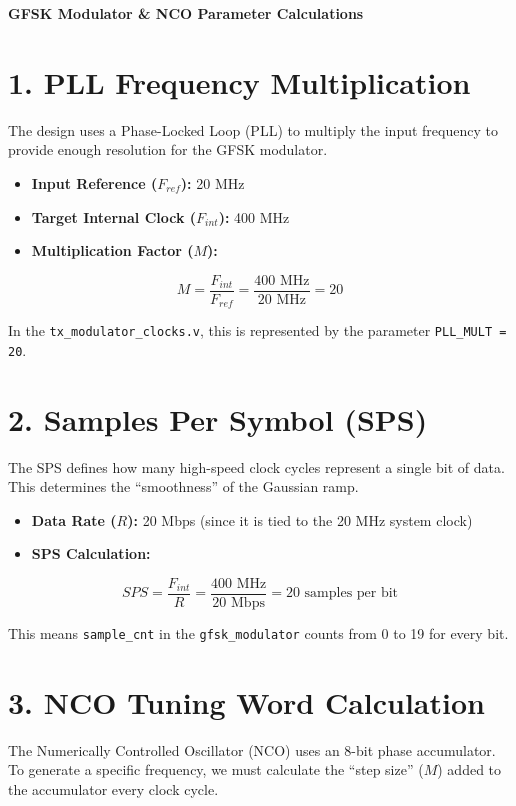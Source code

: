 \documentclass[12pt]{article}
\begin{document}
\begin{center}
    \Large\textbf{GFSK Modulator \& NCO Parameter Calculations} \\
\end{center}
\vspace{1em}

\section*{1. PLL Frequency Multiplication}
The design uses a Phase-Locked Loop (PLL) to multiply the input frequency to provide enough resolution for the GFSK modulator.
\begin{itemize}
    \item \textbf{Input Reference ($F_{ref}$):} 20 MHz
    \item \textbf{Target Internal Clock ($F_{int}$):} 400 MHz
    \item \textbf{Multiplication Factor ($M$):}
\end{itemize}
\[ M = \frac{F_{int}}{F_{ref}} = \frac{400 \text{ MHz}}{20 \text{ MHz}} = 20 \]

\noindent In the \texttt{tx\_modulator\_clocks.v}, this is represented by the parameter \texttt{PLL\_MULT = 20}.

\section*{2. Samples Per Symbol (SPS)}
The SPS defines how many high-speed clock cycles represent a single bit of data. This determines the ``smoothness'' of the Gaussian ramp.
\begin{itemize}
    \item \textbf{Data Rate ($R$):} 20 Mbps (since it is tied to the 20 MHz system clock)
    \item \textbf{SPS Calculation:}
\end{itemize}
\[ SPS = \frac{F_{int}}{R} = \frac{400 \text{ MHz}}{20 \text{ Mbps}} = 20 \text{ samples per bit} \]

\noindent This means \texttt{sample\_cnt} in the \texttt{gfsk\_modulator} counts from 0 to 19 for every bit.

\section*{3. NCO Tuning Word Calculation}
The Numerically Controlled Oscillator (NCO) uses an 8-bit phase accumulator. To generate a specific frequency, we must calculate the ``step size'' ($M$) added to the accumulator every clock cycle.
\end{document}
